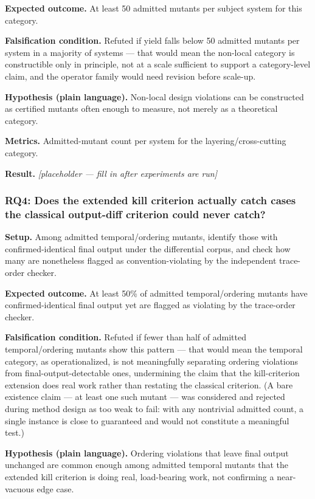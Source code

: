 \documentclass[11pt]{article}
\newcommand{\ph}{\textit{[placeholder --- fill in after experiments are run]}}
\begin{document}
\textbf{Expected outcome.} At least 50 admitted mutants per subject system for this category.

\textbf{Falsification condition.} Refuted if yield falls below 50 admitted mutants per system in a majority of systems --- that would mean the non-local category is constructible only in principle, not at a scale sufficient to support a category-level claim, and the operator family would need revision before scale-up.

\textbf{Hypothesis (plain language).} Non-local design violations can be constructed as certified mutants often enough to measure, not merely as a theoretical category.

\textbf{Metrics.} Admitted-mutant count per system for the layering/cross-cutting category.

\textbf{Result.} \ph

\subsubsection{RQ4: Does the extended kill criterion actually catch cases the classical output-diff criterion could never catch?}
\textbf{Setup.} Among admitted temporal/ordering mutants, identify those with confirmed-identical final output under the differential corpus, and check how many are nonetheless flagged as convention-violating by the independent trace-order checker.

\textbf{Expected outcome.} At least 50\% of admitted temporal/ordering mutants have confirmed-identical final output yet are flagged as violating by the trace-order checker.

\textbf{Falsification condition.} Refuted if fewer than half of admitted temporal/ordering mutants show this pattern --- that would mean the temporal category, as operationalized, is not meaningfully separating ordering violations from final-output-detectable ones, undermining the claim that the kill-criterion extension does real work rather than restating the classical criterion. (A bare existence claim --- at least one such mutant --- was considered and rejected during method design as too weak to fail: with any nontrivial admitted count, a single instance is close to guaranteed and would not constitute a meaningful test.)

\textbf{Hypothesis (plain language).} Ordering violations that leave final output unchanged are common enough among admitted temporal mutants that the extended kill criterion is doing real, load-bearing work, not confirming a near-vacuous edge case.
\end{document}
